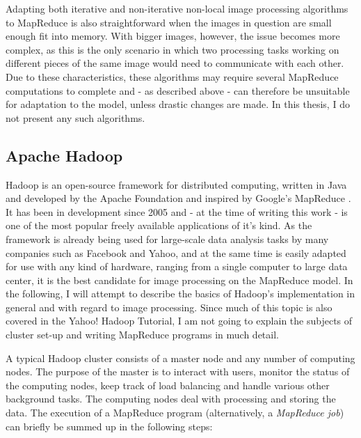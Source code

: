 \documentclass [12pt,a4paper]{report}
\begin{document}
Adapting both iterative and non-iterative non-local image processing algorithms to MapReduce is also straightforward when the images in question are small enough fit into memory. With bigger images, however, the issue becomes more complex, as this is the only scenario in which two processing tasks working on different pieces of the same image would need to communicate with each other. Due to these characteristics, these algorithms may require several MapReduce computations to complete and - as described above - can therefore be unsuitable for adaptation to the model, unless drastic changes are made. In this thesis, I do not present any such algorithms.

\subsection{Apache Hadoop}
Hadoop is an open-source framework for distributed computing, written in Java and developed by the Apache Foundation and inspired by Google's MapReduce \cite{white2012hadoop}. It has been in development since 2005 and - at the time of writing this work - is one of the most popular freely available applications of it's kind. As the framework is already being used for large-scale data analysis tasks by many companies such as Facebook and Yahoo, and at the same time is easily adapted for use with any kind of hardware, ranging from a single computer to large data center, it is the best candidate for image processing on the MapReduce model. In the following, I will attempt to describe the basics of Hadoop's implementation in general and with regard to image processing. Since much of this topic is also covered in the Yahoo! Hadoop Tutorial, I am not going to explain the subjects of cluster set-up and writing MapReduce programs in much detail.

A typical Hadoop cluster consists of a master node and any number of computing nodes. The purpose of the master is to interact with users, monitor the status of the computing nodes, keep track of load balancing and handle various other background tasks. The computing nodes deal with processing and storing the data. The execution of a MapReduce program (alternatively, a \textit{MapReduce job}) can briefly be summed up in the following steps:
\end{document}
